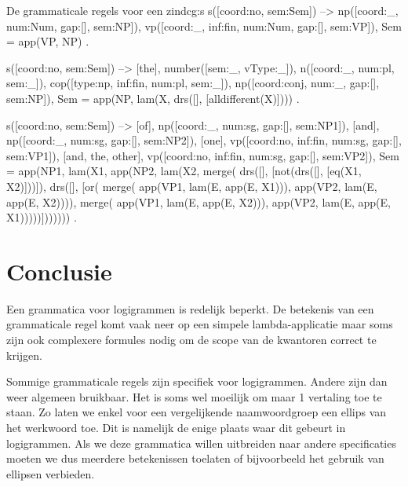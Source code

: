 \begin{dcg}{De grammaticale regels voor een zin}{dcg:s}
s([coord:no, sem:Sem]) -->
  np([coord:_, num:Num, gap:[], sem:NP]),
  vp([coord:_, inf:fin, num:Num, gap:[], sem:VP]),
  { Sem = app(VP, NP) }.

s([coord:no, sem:Sem]) -->
  [the],
  number([sem:_, vType:_]),
  n([coord:_, num:pl, sem:_]),
  cop([type:np, inf:fin, num:pl, sem:_]),
  np([coord:conj, num:_, gap:[], sem:NP]),
  { Sem = app(NP, lam(X, drs([], [alldifferent(X)]))) }.

s([coord:no, sem:Sem]) -->
  [of],
  np([coord:_, num:sg, gap:[], sem:NP1]),
  [and],
  np([coord:_, num:sg, gap:[], sem:NP2]),
  [one],
  vp([coord:no, inf:fin, num:sg, gap:[], sem:VP1]),
  [and, the, other],
  vp([coord:no, inf:fin, num:sg, gap:[], sem:VP2]),
  { Sem = app(NP1, lam(X1, app(NP2, lam(X2, 
      merge(
        drs([], [not(drs([], [eq(X1, X2)]))]),
        drs([], [or(
          merge(
            app(VP1, lam(E, app(E, X1))), 
            app(VP2, lam(E, app(E, X2)))), 
          merge(
            app(VP1, lam(E, app(E, X2))),
            app(VP2, lam(E, app(E, X1)))))])))))) }.
\end{dcg}

\section{Conclusie}
Een grammatica voor logigrammen is redelijk beperkt. De betekenis van een grammaticale regel komt vaak neer op een simpele lambda-applicatie maar soms zijn ook complexere formules nodig om de scope van de kwantoren correct te krijgen.

Sommige grammaticale regels zijn specifiek voor logigrammen. Andere zijn dan weer algemeen bruikbaar. Het is soms wel moeilijk om maar 1 vertaling toe te staan. Zo laten we enkel voor een vergelijkende naamwoordgroep een ellips van het werkwoord toe. Dit is namelijk de enige plaats waar dit gebeurt in logigrammen. Als we deze grammatica willen uitbreiden naar andere specificaties moeten we dus meerdere betekenissen toelaten of bijvoorbeeld het gebruik van ellipsen verbieden.
